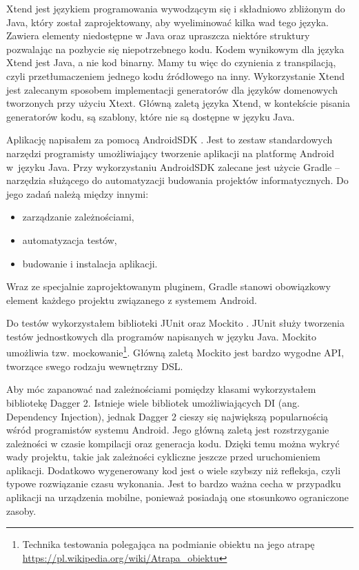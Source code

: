 \documentclass[openright]{xmgr}
\begin{document}
Xtend jest językiem programowania wywodzącym się i składniowo zbliżonym do Java, który został zaprojektowany, aby wyeliminować kilka wad tego języka. Zawiera elementy niedostępne w Java oraz upraszcza niektóre struktury pozwalając na pozbycie się niepotrzebnego kodu. Kodem wynikowym dla języka Xtend jest Java, a nie kod binarny. Mamy tu więc do czynienia z transpilacją, czyli przetłumaczeniem jednego kodu źródłowego na inny. Wykorzystanie Xtend jest zalecanym sposobem implementacji generatorów dla języków domenowych tworzonych przy użyciu Xtext. Główną zaletą języka Xtend, w kontekście pisania generatorów kodu, są szablony, które nie są dostępne w języku Java.

Aplikację napisałem za pomocą AndroidSDK \cite{AndroidSDK:2017:Doc}. Jest to zestaw standardowych narzędzi programisty umożliwiający tworzenie aplikacji na platformę Android w~języku Java. Przy wykorzystaniu AndroidSDK zalecane jest użycie Gradle \cite{Gradle:2017:Doc} -- narzędzia służącego do automatyzacji budowania projektów informatycznych. Do jego zadań należą między innymi:
\begin{itemize}
\item zarządzanie zależnościami,
\item automatyzacja testów,
\item budowanie i instalacja aplikacji.
\end{itemize}
Wraz ze specjalnie zaprojektowanym pluginem, Gradle stanowi obowiązkowy element każdego projektu związanego z systemem Android.

Do testów wykorzystałem biblioteki JUnit \cite{JUnit:2017:Doc} oraz Mockito \cite{Mockito:2017:Doc}. JUnit służy tworzenia testów jednostkowych dla programów napisanych w języku Java. Mockito umożliwia tzw. mockowanie\footnote{Technika testowania polegająca na podmianie obiektu na jego atrapę \url{https://pl.wikipedia.org/wiki/Atrapa_obiektu}}.  Główną zaletą Mockito jest bardzo wygodne API, tworzące swego rodzaju wewnętrzny DSL.

Aby móc zapanować nad zależnościami pomiędzy klasami wykorzystałem bibliotekę Dagger 2.
Istnieje wiele bibliotek umożliwiających DI (ang. Dependency Injection), jednak Dagger 2 cieszy się największą popularnością wśród programistów systemu Android. Jego główną zaletą jest rozstrzyganie zależności w czasie kompilacji oraz generacja kodu. Dzięki temu można wykryć wady projektu, takie jak zależności cykliczne jeszcze przed uruchomieniem aplikacji. Dodatkowo wygenerowany kod jest o wiele szybszy niż refleksja, czyli typowe rozwiązanie czasu wykonania. Jest to bardzo ważna cecha w przypadku aplikacji na urządzenia mobilne, ponieważ posiadają one stosunkowo ograniczone zasoby. 
\end{document}
